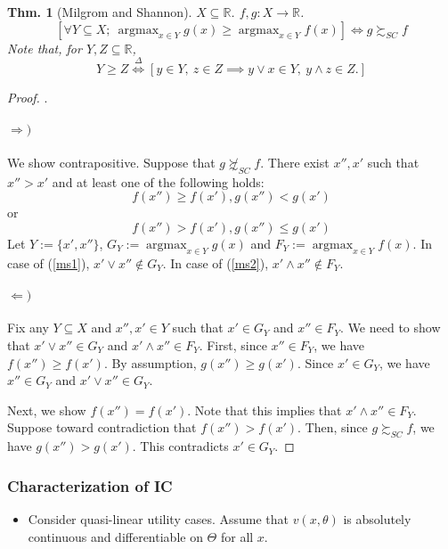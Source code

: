\documentclass[11pt,a4paper,dvipdfmx]{article}
\theoremstyle{plain}
\newtheorem{thm}{Thm.}[section]
\newcommand{\R}{\mathbb{R}}
\newcommand{\defi}{\stackrel{\Delta}{\Longleftrightarrow}}
\newcommand{\equi}{\Longleftrightarrow}
\newcommand{\1}{\mathbbm{1}}
\DeclareMathOperator*{\argmax}{argmax}
\begin{document}
\begin{thm}[Milgrom and Shannon]
	$X \subseteq \R$. $f,g: X \to \R$.
	\[
	[\forall Y \subseteq X; \ \argmax_{x \in Y} g(x) \geq \argmax_{x \in Y} f(x)
	]
	\equi g \succsim_{SC} f
	\]
	Note that, for $Y,Z \subseteq \R$,
	\[
	Y \geq Z
	\defi  [y \in Y, \ z \in Z
	\implies y \vee x \in Y, \ y \wedge z \in Z.
	]
	\]
\end{thm}
\begin{proof}.
	\paragraph{$\Rightarrow)$}
	We show contrapositive. Suppose that $g \not\succsim_{SC} f$.
	There exist $x'', x'$ such that $x'' > x'$ and at least one of the following holds:
	\begin{equation}
		f(x'') \geq f(x'), g(x'') < g(x') \label{ms1}
	\end{equation}
	or
	\begin{equation}
		f(x'') > f(x'), g(x'') \leq g(x') \label{ms2}
	\end{equation}
	Let $Y := \{x', x''\}$, $G_Y := \argmax_{x \in Y} g(x)$ and $F_Y := \argmax_{x \in Y} f(x)$.
	In case of (\ref{ms1}), $x' \vee x'' \notin G_Y$. In case of (\ref{ms2}), $x' \wedge x'' \notin F_Y$.
	
	\paragraph{$\Leftarrow)$}
	Fix any $Y \subseteq X$ and $x'', x' \in Y$ such that $x' \in G_Y$ and $x'' \in F_Y$. We need to show that $x' \vee x'' \in G_Y$ and $x' \wedge x'' \in F_Y$.
	First, since $x'' \in F_Y$, we have $f(x'') \geq f(x')$. By assumption, $g(x'') \geq g(x')$. Since $x' \in G_Y$, we have $x'' \in G_Y$ and $x' \vee x'' \in G_Y$.
	
	Next, we show $f(x'') = f(x')$. Note that this implies that $x' \wedge x'' \in F_Y$. 
	Suppose toward contradiction that $f(x'') > f(x')$. Then, since $g \succsim_{SC} f$, we have $g(x'') > g(x')$. This contradicts $x' \in G_Y$.
\end{proof}


\subsubsection{Characterization of IC}

\begin{itemize}
	\item Consider quasi-linear utility cases. Assume that $v(x, \theta)$ is absolutely continuous and differentiable on $\Theta$ for all $x$.
\end{itemize}
\end{document}
